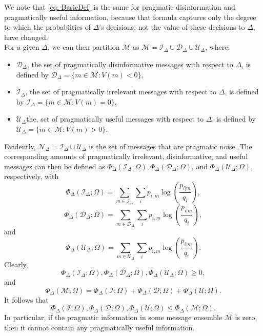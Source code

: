 \documentclass[11pt]{article}
\begin{document}
We note that \eqref{eq: BasicDef} is the same for pragmatic disinformation and pragmatically useful information, 
because that formula captures only the degree to which the probabilties of $\Delta$'s decisions, 
not the value of these decisions to $\Delta$, have changed.\\

For a given $\Delta$, we can then partition $\mathcal M$ as $\mathcal M = \mathcal I_\Delta \cup \mathcal D_\Delta \cup \mathcal U_\Delta$, where: 
\begin{itemize}
\item $\mathcal D_\Delta$, the set of pragmatically disinformative messages with respect to $\Delta$, is defined by $\mathcal D_\Delta = \{m \in \mathcal M: V(m) < 0\},$
\item $\mathcal I_\Delta$, the set of pragmatically irrelevant messages with respect to $\Delta$, is defined by $\mathcal I_\Delta = \{m \in \mathcal M: V(m) = 0\},$
\item $\mathcal U_\Delta$the,  set of pragmatically useful messages with respect to $\Delta$, is defined by $\mathcal U_\Delta = \{m \in \mathcal M: V(m) > 0\}$.
\end{itemize}
Evidently, $\mathcal N_\Delta = \mathcal I_\Delta \cup \mathcal U_\Delta$ is the set of messages that are
pragmatic noise.
The corresponding amounts of pragmatically irrelevant, disinformative, and useful messages can then be defined as 
$\Phi_{\Delta} (\mathcal I_\Delta; \Omega), \Phi_{\Delta} (\mathcal D_\Delta; \Omega)$, and $\Phi_{\Delta} (\mathcal U_\Delta; \Omega)$, respectively, with
$$
\Phi_{\Delta} (\mathcal I_\Delta; \Omega) =  
    \sum_{m \in \mathcal I_\Delta} \sum_i p_{i, m} \log \left(\frac{p_{i|m}}{q_i}\right), 
$$
$$
\Phi_{\Delta} (\mathcal D_\Delta; \Omega) =  
    \sum_{m \in \mathcal D_\Delta} \sum_i p_{i, m} \log \left(\frac{p_{i|m}}{q_i}\right), 
$$
and
$$
\Phi_{\Delta} (\mathcal U_\Delta; \Omega) =  
    \sum_{m \in \mathcal U_\Delta} \sum_i p_{i, m} \log \left(\frac{p_{i|m}}{q_i}\right).
$$
Clearly, 
$$
\Phi_{\Delta} (\mathcal I_\Delta; \Omega), \Phi_{\Delta} (\mathcal D_\Delta; \Omega), \Phi_{\Delta} (\mathcal U_\Delta; \Omega) \geq 0,
$$
and
$$
\Phi_{\Delta} ({\mathcal M}; \Omega) = \Phi_{\Delta} (\mathcal I; \Omega) +
                                                          \Phi_{\Delta} (\mathcal D; \Omega) +
                                                           \Phi_{\Delta} (\mathcal U; \Omega).
$$
It follows that 
$$
\Phi_{\Delta} (\mathcal I; \Omega), \Phi_{\Delta} (\mathcal D; \Omega), \Phi_{\Delta} (\mathcal U; \Omega) \leq \Phi_{\Delta} (\mathcal M; \Omega).
$$
In particular, if the pragmatic information in some message ensemble $\mathcal M$ is zero, then it cannot contain any pragmatically useful information.\\
\end{document}
